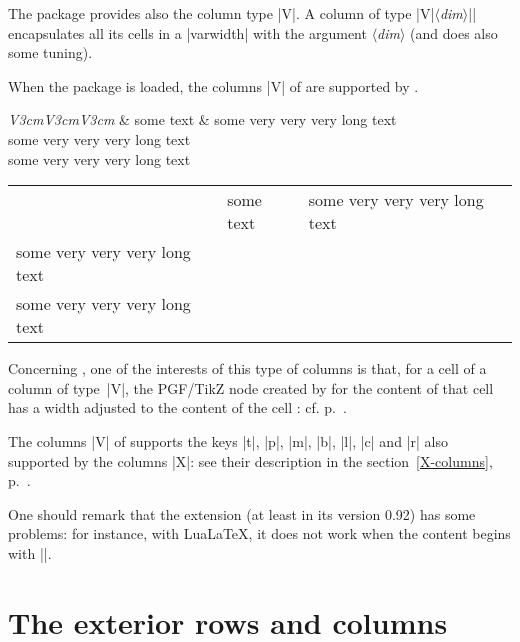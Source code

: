 \documentclass[dvipsnames]{article}%
\begin{document}
\bigskip
The package  provides also the column type |V|. A column of type
|V{|$\langle$\textsl{dim}$\rangle$|}| encapsulates all its cells in a
|{varwidth}| with the argument $\langle$\textsl{dim}$\rangle$ (and does also some tuning).

\smallskip
When the package  is loaded, the columns |V| of 
are supported by . 

\medskip
\begin{Code}
\begin{NiceTabular}[corners=NW,hvlines]{\emph{V{3cm}V{3cm}V{3cm}}}
& some text & some very very very long text \\
some very very very long text \\
some very very very long text 
\end{NiceTabular}
\end{Code}

\medskip
\begin{center}
\begin{NiceTabular}[corners=NW,hvlines]{V{3cm}V{3cm}V{3cm}}
& some text & some very very very long text \\
some very very very long text \\
some very very very long text 
\end{NiceTabular}
\end{center}

\bigskip
Concerning , one of the
interests of this type of columns is that, for a cell of a column of type~|V|,
the PGF/TikZ node created by  for the content of that cell has
a width adjusted to the content of the cell : cf. p.~\pageref{node-V}. 


\bigskip
The columns |V| of  supports the keys |t|, |p|, |m|, |b|, |l|,
|c| and |r| also supported by the columns |X|: see their description in the
section~\ref{X-columns}, p.~\pageref{X-columns}.

\bigskip
One should remark that the extension  (at least in its version
0.92) has some problems: for instance, with LuaLaTeX, it does not work when
the content begins with |\color|.



\bigskip
\section{The exterior rows and columns}
\end{document}
